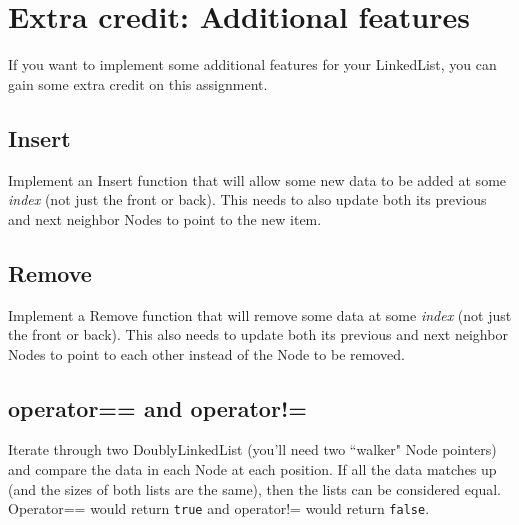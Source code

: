 \documentclass[a4paper,12pt,oneside]{book}
\begin{document}
    \chapter{Extra credit: Additional features}
    
    If you want to implement some additional features for your LinkedList,
    you can gain some extra credit on this assignment.
    
    \section{Insert}
    
        Implement an Insert function that will allow some new data
        to be added at some \textit{index} (not just the front or back).
        This needs to also update both its previous and next neighbor
        Nodes to point to the new item.
    
    \section{Remove}
    
        Implement a Remove function that will remove some data at
        some \textit{index} (not just the front or back).
        This also needs to update both its previous and next neighbor
        Nodes to point to each other instead of the Node to be removed.
    
    \section{operator== and operator!=}
    
        Iterate through two DoublyLinkedList (you'll need two ``walker"
        Node pointers) and compare the data in each Node at each position.
        If all the data matches up (and the sizes of both lists are the same),
        then the lists can be considered equal. Operator== would return
        \texttt{true} and operator!= would return \texttt{false}.
\end{document}
